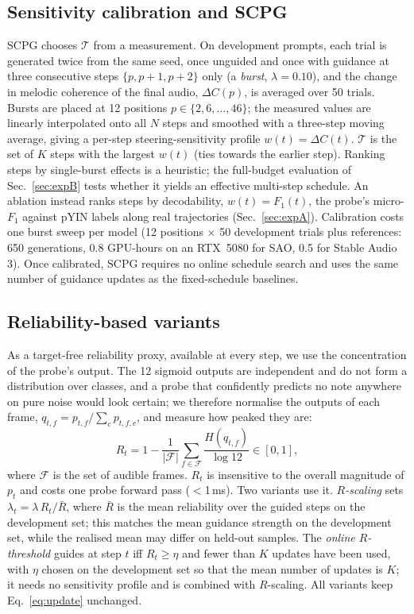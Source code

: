 \documentclass{article}
\begin{document}
\subsection{Sensitivity calibration and SCPG}
\label{sec:scpg}
SCPG chooses $\mathcal{T}$ from a measurement. On development prompts, each trial is generated twice from the same seed, once unguided and once with guidance at three consecutive steps $\{p,p{+}1,p{+}2\}$ only (a \emph{burst}, $\lambda{=}0.10$), and the change in melodic coherence of the final audio, $\Delta C(p)$, is averaged over 50 trials. Bursts are placed at 12 positions $p\in\{2,6,\dots,46\}$; the measured values are linearly interpolated onto all $N$ steps and smoothed with a three-step moving average, giving a per-step steering-sensitivity profile $w(t){=}\Delta C(t)$. $\mathcal{T}$ is the set of $K$ steps with the largest $w(t)$ (ties towards the earlier step). Ranking steps by single-burst effects is a heuristic; the full-budget evaluation of Sec.~\ref{sec:expB} tests whether it yields an effective multi-step schedule. An ablation instead ranks steps by decodability, $w(t){=}F_1(t)$, the probe's micro-$F_1$ against pYIN labels along real trajectories (Sec.~\ref{sec:expA}). Calibration costs one burst sweep per model (12 positions $\times$ 50 development trials plus references: 650 generations, 0.8 GPU-hours on an RTX~5080 for SAO, 0.5 for Stable Audio 3). Once calibrated, SCPG requires no online schedule search and uses the same number of guidance updates as the fixed-schedule baselines.

\subsection{Reliability-based variants}
\label{sec:rel}
As a target-free reliability proxy, available at every step, we use the concentration of the probe's output. The 12 sigmoid outputs are independent and do not form a distribution over classes, and a probe that confidently predicts no note anywhere on pure noise would look certain; we therefore normalise the outputs of each frame, $q_{t,f}{=}p_{t,f}/\sum_c p_{t,f,c}$, and measure how peaked they are:
\begin{equation}
R_t = 1-\frac{1}{|\mathcal{F}|}\sum_{f\in\mathcal{F}}\frac{H(q_{t,f})}{\log 12}\in[0,1],
\label{eq:rel}
\end{equation}
where $\mathcal{F}$ is the set of audible frames. $R_t$ is insensitive to the overall magnitude of $p_t$ and costs one probe forward pass ($<$1\,ms). Two variants use it. \emph{$R$-scaling} sets $\lambda_t{=}\lambda\,R_t/\bar R$, where $\bar R$ is the mean reliability over the guided steps on the development set; this matches the mean guidance strength on the development set, while the realised mean may differ on held-out samples. The \emph{online $R$-threshold} guides at step $t$ iff $R_t\ge\eta$ and fewer than $K$ updates have been used, with $\eta$ chosen on the development set so that the mean number of updates is $K$; it needs no sensitivity profile and is combined with $R$-scaling. All variants keep Eq.~\eqref{eq:update} unchanged.
\end{document}
